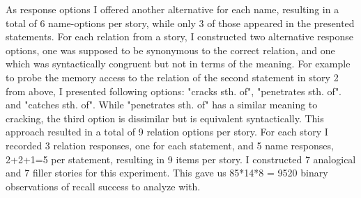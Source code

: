\documentclass[a4paper,man,natbib,floatsintext,import]{apa6}
\begin{document}
As response options I offered another alternative for each name, resulting in a total of 6 name-options per story, while only 3 of those appeared in the presented statements. For each relation from a story, I constructed two alternative response options, one was supposed to be synonymous to the correct relation, and one which was syntactically congruent but not in terms of the meaning. For example to probe the memory access to the relation of the second statement in story 2 from above, I presented following options: "cracks sth. of", "penetrates sth. of". and "catches sth. of". While "penetrates sth. of" has a similar meaning to cracking, the third option is dissimilar but is equivalent syntactically. This approach resulted in a total of 9 relation options per story. For each story I recorded 3 relation responses, one for each statement, and 5 name responses, 2+2+1=5 per statement, resulting in 9 items per story. I constructed 7 analogical and 7 filler stories for this experiment. This gave us 85*14*8 = 9520 binary observations of recall success to analyze with.
\end{document}
